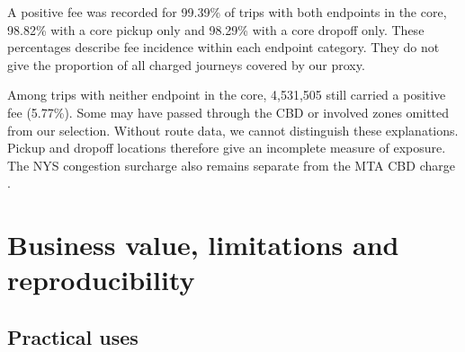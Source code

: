 \documentclass[10pt,a4paper]{article}
\begin{document}
\begin{center}
\label{fig:fees}
\end{center}

A positive fee was recorded for 99.39\% of trips with both endpoints in the core, 98.82\% with a core pickup only and 98.29\% with a core dropoff only. These percentages describe fee incidence within each endpoint category. They do not give the proportion of all charged journeys covered by our proxy.

Among trips with neither endpoint in the core, 4,531,505 still carried a positive fee (5.77\%). Some may have passed through the CBD or involved zones omitted from our selection. Without route data, we cannot distinguish these explanations. Pickup and dropoff locations therefore give an incomplete measure of exposure. The NYS congestion surcharge also remains separate from the MTA CBD charge \cite{dictionary,mta}.

\section{Business value, limitations and reproducibility}

\subsection{Practical uses}
\end{document}
